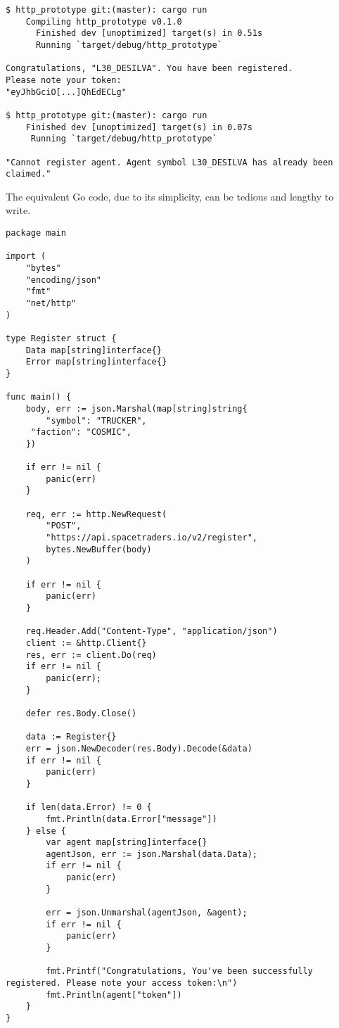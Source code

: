 \begin{lstlisting}
$ http_prototype git:(master): cargo run
    Compiling http_prototype v0.1.0 
      Finished dev [unoptimized] target(s) in 0.51s
      Running `target/debug/http_prototype`

Congratulations, "L30_DESILVA". You have been registered.
Please note your token:
"eyJhbGciO[...]QhEdECLg"

$ http_prototype git:(master): cargo run
    Finished dev [unoptimized] target(s) in 0.07s
     Running `target/debug/http_prototype`

"Cannot register agent. Agent symbol L30_DESILVA has already been claimed." 

\end{lstlisting}

The equivalent Go code, due to its simplicity, can be tedious and lengthy to write. 

\begin{lstlisting}
package main

import (
	"bytes"
	"encoding/json"
	"fmt"
	"net/http"
)

type Register struct {
    Data map[string]interface{}
    Error map[string]interface{}
}

func main() {
    body, err := json.Marshal(map[string]string{
        "symbol": "TRUCKER",
	 "faction": "COSMIC",
    }) 

    if err != nil {
        panic(err)
    }

    req, err := http.NewRequest(
        "POST",       
        "https://api.spacetraders.io/v2/register", 
        bytes.NewBuffer(body)
    )

    if err != nil {
        panic(err)
    }

    req.Header.Add("Content-Type", "application/json")
    client := &http.Client{}
    res, err := client.Do(req)
    if err != nil {
        panic(err);
    }

    defer res.Body.Close()

    data := Register{}
    err = json.NewDecoder(res.Body).Decode(&data)
    if err != nil {
        panic(err)
    }

    if len(data.Error) != 0 {
        fmt.Println(data.Error["message"])
    } else {
        var agent map[string]interface{}
        agentJson, err := json.Marshal(data.Data);
        if err != nil {
            panic(err)
        }

        err = json.Unmarshal(agentJson, &agent);
        if err != nil {
            panic(err)
        }

        fmt.Printf("Congratulations, You've been successfully registered. Please note your access token:\n")
        fmt.Println(agent["token"])
    }
}
\end{lstlisting}

